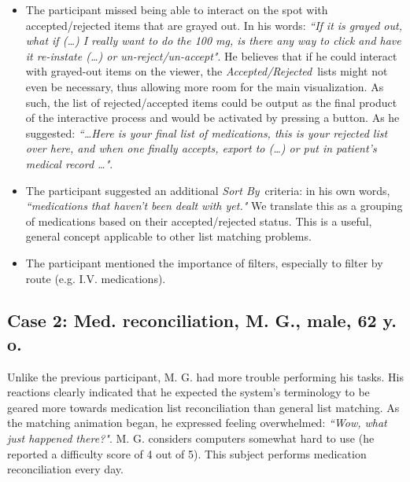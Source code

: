 \documentclass{chi2009}
\newcommand{\AcceptedRejected}{\textit{Accepted/Rejected}}
\newcommand{\SortBy}{\textit{Sort By}}
\begin{document}
\begin{itemize}
\item The participant missed being able to interact on the spot with accepted/rejected items that are grayed out. In his words: \textit{``If it is grayed out, what if (\dots) I really want to do the 100 mg, is there any way to click and have it re-instate (\dots) or un-reject/un-accept"}. He believes that if he could interact with grayed-out items on the viewer, the \AcceptedRejected~lists might not even be necessary, thus allowing more room for the main visualization. As such, the list of rejected/accepted items could be output as the final product of the interactive process and would be activated by pressing a button. As he suggested: \textit{``\dots Here is your final list of medications, this is your rejected list over here, and when one finally accepts, export to (\dots) or put in patient's medical record \dots"}.
\item The participant suggested an additional \SortBy~criteria: in his own words, \textit{``medications that haven't been dealt with yet."} We translate this as a grouping of medications based on their accepted/rejected status. This is a useful, general concept applicable to other list matching problems.
\item The participant mentioned the importance of filters, especially to filter by route (e.g. I.V. medications).  
\end{itemize}

\subsection{Case 2: Med. reconciliation, M. G., male, 62 y. o.}

Unlike the previous participant, M. G. had more trouble performing his tasks. His reactions clearly indicated that he expected the system's terminology to be geared more towards medication list reconciliation
than general list matching. As the matching animation began, he expressed feeling overwhelmed: \textit{``Wow, what just happened there?"}. M. G. considers computers somewhat hard to use (he reported a difficulty score of 4 out of 5). This subject performs medication reconciliation every day. 
\end{document}
